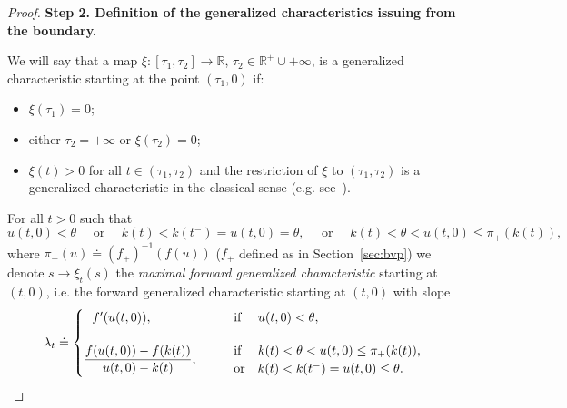 \documentclass[a4paper, 10pt, final]{article}
\newcommand{\R}{\mathbb{R}} \newcommand{\N}{\mathbb{N}}
\begin{document}
\begin{proof}
  \noindent 
  {\bf Step 2. Definition of the generalized characteristics issuing from the boundary. }


  We will say that a map $\xi\colon [\tau_1, \tau_2] \to \R$,
  $\tau_2\in \R^+\cup{+\infty}$,
  is a generalized characteristic starting at the point $(\tau_1, 0)$ if:
  \vspace{-2pt}
  \begin{itemize}
    \item[-]  $\xi(\tau_1)=0$;
    \vspace{-2pt}
    \item[-]  either $\tau_2 =+\infty$ or $\xi(\tau_2)=0$;
    \vspace{-2pt}
    \item[-] $\xi(t)>0$ for all $t\in (\tau_1,\tau_2)$ and the restriction 
      of $\xi$ to $(\tau_1,\tau_2)$ is a generalized characteristic 
      in the classical sense (e.g. see~\cite{d,daf-book}).
  \end{itemize}
  For all $t>0$ such that %
  \begin{equation}
  \label{eq:condexistforwchar}
      u(t,0)<\theta\quad  \text{  or  } \quad k(t)<k(t^-)=u(t,0)=\theta,\quad \text{ or   }\quad 
  k(t)<\theta<u(t,0)\leq \pi_+(k(t)),
  \end{equation} where $\pi_+(u)\doteq (f_+)^{-1} (f(u))$
  ($f_+$ defined as in Section~\ref{sec:bvp}) 
  we denote   $s\to \xi_{t}(s)$   the {\it maximal forward generalized characteristic} starting at $(t,0)$, i.e. the forward generalized characteristic starting at $(t,0)$ with slope 
  \begin{equation}
    \label{eq:slopeforwchar}
    \lambda_t \doteq
    \begin{cases}
        \ \ f'(u(t,0)),\qquad
        &\text{if}\quad \ u(t,0) <\theta, 
        \\
        \noalign{\bigskip}
        \dfrac{f(u(t,0))-f(k(t))}{u(t,0)-k(t)},
        \qquad
        & \!\!\!
        \begin{array}{l}
          \text{if}\quad \ k(t)<\theta<u(t,0)\leq \pi_+(k(t)),
          \\
          \text{or}\quad 
          k(t)<k(t^-)=u(t,0)\leq \theta.
        \end{array}
          \end{cases}
  \end{equation}
  


\end{proof}
\end{document}
